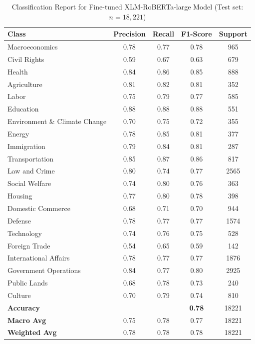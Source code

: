 \documentclass[
  letterpaper,
  DIV=11,
  numbers=noendperiod]{scrartcl}
\begin{document}
\begin{table}[ht]
\caption{Classification Report for Fine-tuned XLM-RoBERTa-large Model (Test set: $n = 18{,}221$)}
\centering
\begin{tabular}{lcccc}
\hline
\textbf{Class} & \textbf{Precision} & \textbf{Recall} & \textbf{F1-Score} & \textbf{Support} \\
\hline
Macroeconomics               & 0.78 & 0.77 & 0.78 &  965 \\
Civil Rights                 & 0.59 & 0.67 & 0.63 &  679 \\
Health                       & 0.84 & 0.86 & 0.85 &  888 \\
Agriculture                  & 0.81 & 0.82 & 0.81 &  352 \\
Labor                        & 0.75 & 0.79 & 0.77 &  585 \\
Education                    & 0.88 & 0.88 & 0.88 &  551 \\
Environment \& Climate Change & 0.70 & 0.75 & 0.72 &  355 \\
Energy                       & 0.78 & 0.85 & 0.81 &  377 \\
Immigration                  & 0.79 & 0.84 & 0.81 &  287 \\
Transportation               & 0.85 & 0.87 & 0.86 &  817 \\
Law and Crime                & 0.80 & 0.74 & 0.77 & 2565 \\
Social Welfare               & 0.74 & 0.80 & 0.76 &  363 \\
Housing                      & 0.77 & 0.80 & 0.78 &  398 \\
Domestic Commerce            & 0.68 & 0.71 & 0.70 &  944 \\
Defense                      & 0.78 & 0.77 & 0.77 & 1574 \\
Technology                   & 0.74 & 0.76 & 0.75 &  528 \\
Foreign Trade                & 0.54 & 0.65 & 0.59 &  142 \\
International Affairs        & 0.78 & 0.77 & 0.77 & 1876 \\
Government Operations        & 0.84 & 0.77 & 0.80 & 2925 \\
Public Lands                 & 0.68 & 0.78 & 0.73 &  240 \\
Culture                      & 0.70 & 0.79 & 0.74 &  810 \\
\hline
\textbf{Accuracy}     &       &       & \textbf{0.78} & 18221 \\
\textbf{Macro Avg}    & 0.75  & 0.78  & 0.77  & 18221 \\
\textbf{Weighted Avg} & 0.78  & 0.78  & 0.78  & 18221 \\
\hline
\end{tabular}

\end{table}
\end{document}
